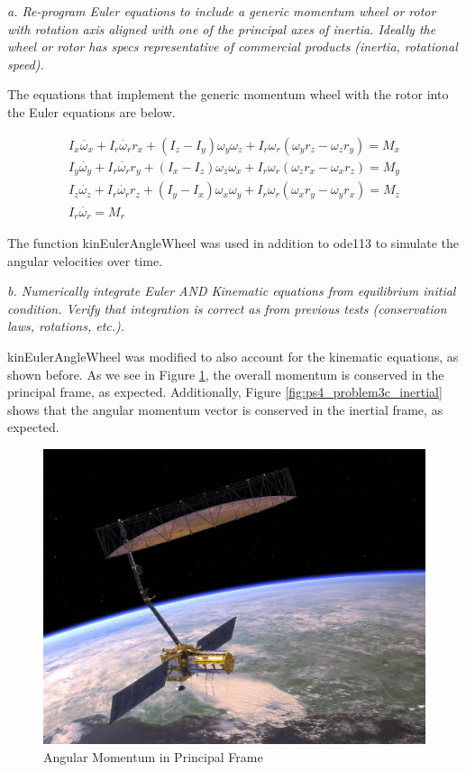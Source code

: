 \textit{a. Re-program Euler equations to include a generic momentum wheel or rotor with rotation axis aligned with one of the principal axes of inertia. Ideally the wheel or rotor has specs representative of commercial products (inertia, rotational speed).}

The equations that implement the generic momentum wheel with the rotor into the Euler equations are below.

\begin{align*}
    I_x \dot{\omega_x} + I_r \dot{\omega_r} r_x + (I_z - I_y) \omega_y \omega_z 
    + I_r \omega_r (\omega_y r_z - \omega_z r_y) = M_x \\
    I_y \dot{\omega_y} + I_r \dot{\omega_r} r_y + (I_x - I_z) \omega_z \omega_x 
    + I_r \omega_r (\omega_z r_x - \omega_x r_z) = M_y \\
    I_z \dot{\omega_z} + I_r \dot{\omega_r} r_z + (I_y - I_x) \omega_x \omega_y 
    + I_r \omega_r (\omega_x r_y - \omega_y r_x) = M_z \\
    I_r \dot{\omega_r} = M_r
\end{align*}

The function kinEulerAngleWheel was used in addition to ode113 to simulate the angular velocities over time.

\textit{b. Numerically integrate Euler AND Kinematic equations from equilibrium initial condition. Verify that integration is correct as from previous tests (conservation laws, rotations, etc.).}

kinEulerAngleWheel was modified to also account for the kinematic equations, as shown before. As we see in Figure \ref{fig:ps4_problem3c_principal}, the overall momentum is conserved in the principal frame, as expected. Additionally, Figure \ref{fig:ps4_problem3c_inertial} shows that the angular momentum vector is conserved in the inertial frame, as expected.



\begin{figure}[H]
\centering
\includegraphics[scale=0.6]{Images/NISAR.jpg}
\caption{Angular Momentum in Principal Frame}
\label{fig:ps4_problem3c_principal}
\end{figure}

